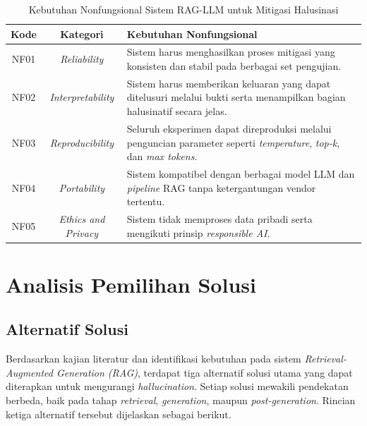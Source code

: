 \begin{table}[H]
\centering
\caption{Kebutuhan Nonfungsional Sistem RAG-LLM untuk Mitigasi Halusinasi}
\label{tbl:kebutuhan-nonfungsional}
\begin{tabular}{|c|c|p{8cm}|}
\hline
\textbf{Kode} & \textbf{Kategori} & \textbf{Kebutuhan Nonfungsional} \\ \hline

NF01 & \textit{Reliability} & Sistem harus menghasilkan proses mitigasi yang konsisten dan stabil pada berbagai set pengujian. \\ \hline

NF02 & \textit{Interpretability} & Sistem harus memberikan keluaran yang dapat ditelusuri melalui bukti serta menampilkan bagian halusinatif secara jelas. \\ \hline

NF03 & \textit{Reproducibility} & Seluruh eksperimen dapat direproduksi melalui penguncian parameter seperti \textit{temperature}, \textit{top-k}, dan \textit{max tokens}. \\ \hline

NF04 & \textit{Portability} & Sistem kompatibel dengan berbagai model LLM dan \textit{pipeline} RAG tanpa ketergantungan vendor tertentu. \\ \hline

NF05 & \textit{Ethics and Privacy} & Sistem tidak memproses data pribadi serta mengikuti prinsip \textit{responsible AI}. \\ \hline

\end{tabular}
\end{table}




\section{Analisis Pemilihan Solusi}
\label{sec:analisis-pemilihan-solusi}

\subsection{Alternatif Solusi}

Berdasarkan kajian literatur dan identifikasi kebutuhan pada sistem \textit{Retrieval-Augmented Generation (RAG)}, terdapat tiga alternatif solusi utama yang dapat diterapkan untuk mengurangi \textit{hallucination}. Setiap solusi mewakili pendekatan berbeda, baik pada tahap \textit{retrieval}, \textit{generation}, maupun \textit{post-generation}. Rincian ketiga alternatif tersebut dijelaskan sebagai berikut.

